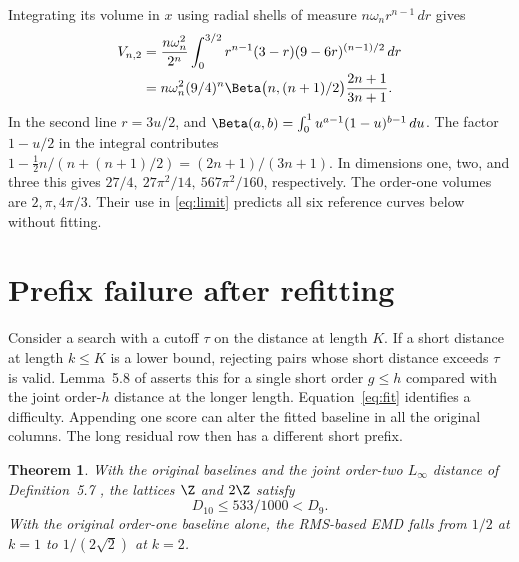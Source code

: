 \documentclass[11pt,a4paper]{article}
\newtheorem{theorem}{Theorem}
\theoremstyle{definition}
\begin{document}
Integrating its volume in \(x\) using radial shells of measure \(n\omega_n r^{n-1}\,dr\) gives
\begin{equation}\label{eq:volume}
\begin{aligned}
V_{n,2}
 &=\frac{n\omega_n^2}{2^n}\int_0^{3/2}
 r^{n-1}(3-r)(9-6r)^{(n-1)/2}\,dr\\
 &= n\omega_n^2(9/4)^n
 \Beta\bigl(n,(n+1)/2\bigr)\frac{2n+1}{3n+1}.
\end{aligned}
\end{equation}
In the second line \(r=3u/2\), and \(\Beta(a,b)=\int_0^1u^{a-1}(1-u)^{b-1}\,du\). The factor \(1-u/2\) in the integral contributes \(1-\tfrac12 n/(n+(n+1)/2)=(2n+1)/(3n+1)\). In dimensions one, two, and three this gives \(27/4,\ 27\pi^2/14,\ 567\pi^2/160\), respectively. The order-one volumes are \(2,\pi,4\pi/3\). Their use in \eqref{eq:limit} predicts all six reference curves below without fitting.

\section{Prefix failure after refitting}\label{sec:counter}

Consider a search with a cutoff \(\tau\) on the distance at length \(K\). If a short distance at length \(k\le K\) is a lower bound, rejecting pairs whose short distance exceeds \(\tau\) is valid. Lemma~5.8 of \cite{wkhigher} asserts this for a single short order \(g\le h\) compared with the joint order-\(h\) distance at the longer length. Equation~\eqref{eq:fit} identifies a difficulty. Appending one score can alter the fitted baseline in all the original columns. The long residual row then has a different short prefix.

\begin{theorem}\label{thm:failure}
With the original baselines and the joint order-two \(L_\infty\) distance of Definition~5.7 \cite{wkhigher}, the lattices \(\Z\) and \(2\Z\) satisfy
\begin{equation}\label{eq:threshold}
D_{10}\le 533/1000<D_9.
\end{equation}
With the original order-one baseline alone, the RMS-based EMD falls from \(1/2\) at \(k=1\) to \(1/(2\sqrt2)\) at \(k=2\).
\end{theorem}
\end{document}
